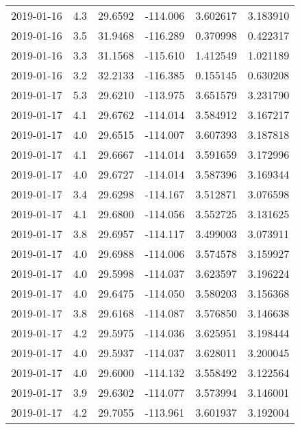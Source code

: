\begin{tabular}{lrrrrr}
2019-01-16 &       4.3 &  29.6592 &  -114.006 &         3.602617 &         3.183910 \\
2019-01-16 &       3.5 &  31.9468 &  -116.289 &         0.370998 &         0.422317 \\
2019-01-16 &       3.3 &  31.1568 &  -115.610 &         1.412549 &         1.021189 \\
2019-01-16 &       3.2 &  32.2133 &  -116.385 &         0.155145 &         0.630208 \\
2019-01-17 &       5.3 &  29.6210 &  -113.975 &         3.651579 &         3.231790 \\
2019-01-17 &       4.1 &  29.6762 &  -114.014 &         3.584912 &         3.167217 \\
2019-01-17 &       4.0 &  29.6515 &  -114.007 &         3.607393 &         3.187818 \\
2019-01-17 &       4.1 &  29.6667 &  -114.014 &         3.591659 &         3.172996 \\
2019-01-17 &       4.0 &  29.6727 &  -114.014 &         3.587396 &         3.169344 \\
2019-01-17 &       3.4 &  29.6298 &  -114.167 &         3.512871 &         3.076598 \\
2019-01-17 &       4.1 &  29.6800 &  -114.056 &         3.552725 &         3.131625 \\
2019-01-17 &       3.8 &  29.6957 &  -114.117 &         3.499003 &         3.073911 \\
2019-01-17 &       4.0 &  29.6988 &  -114.006 &         3.574578 &         3.159927 \\
2019-01-17 &       4.0 &  29.5998 &  -114.037 &         3.623597 &         3.196224 \\
2019-01-17 &       4.0 &  29.6475 &  -114.050 &         3.580203 &         3.156368 \\
2019-01-17 &       3.8 &  29.6168 &  -114.087 &         3.576850 &         3.146638 \\
2019-01-17 &       4.2 &  29.5975 &  -114.036 &         3.625951 &         3.198444 \\
2019-01-17 &       4.0 &  29.5937 &  -114.037 &         3.628011 &         3.200045 \\
2019-01-17 &       4.0 &  29.6000 &  -114.132 &         3.558492 &         3.122564 \\
2019-01-17 &       3.9 &  29.6302 &  -114.077 &         3.573994 &         3.146001 \\
2019-01-17 &       4.2 &  29.7055 &  -113.961 &         3.601937 &         3.192004 \\

\end{tabular}
